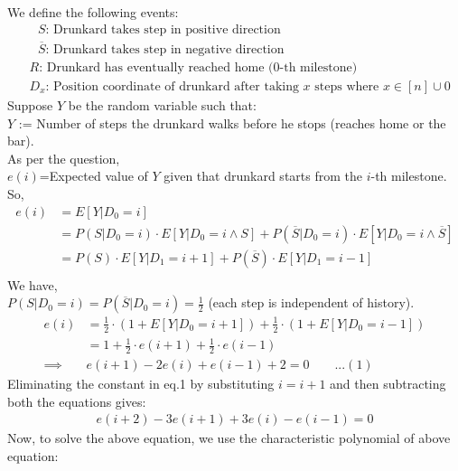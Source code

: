 \documentclass[12pt]{article}
\begin{document}
  \begin{solution}
  We define the following events:
    \begin{align*}
        &\textrm{ $S$: Drunkard takes step in positive direction}\\
        &\textrm{ $\overline{S}$: Drunkard takes step in negative direction}\\
        &\textrm{$R$: Drunkard has eventually reached home (0-th milestone)}\\
        &\textrm{$D_x$: Position coordinate of drunkard after taking $x$ steps where $x \in [n] \cup {0}$}
    \end{align*}
    Suppose $Y$ be the random variable such that:\\
      $Y$ := Number of steps the drunkard walks before he stops (reaches home or the bar).\\
      As per the question,\\
      $e(i)$=Expected value of $Y$ given that drunkard starts from the $i$-th milestone.\\
      So,
      \begin{align*}
        e(i)&=E[Y|D_0 = i]\\
        &=P(S| D_0=i) \cdot E[Y | D_0 = i \wedge S ] + P(\overline{S} | D_0=i) \cdot E[Y | D_0 = i\wedge \overline{S}]\\
        &=P(S) \cdot E[Y|D_1 = i+1] + P(\overline{S}) \cdot E[Y| D_1 = i-1] \\
      \end{align*}
        We have,\\
        $P(S|D_0 = i)= P(\overline{S}|D_0 = i) = \frac{1}{2}$ (each step is independent of history).
      \begin{align*}
        e(i)&=\frac{1}{2}\cdot \left(1 + E[Y|D_0 = i+1]\right) + \frac{1}{2}\cdot \left(1 + E[Y|D_0 = i-1]\right) \\
        &=1 + \frac{1}{2} \cdot e(i+1) + \frac{1}{2} \cdot e(i-1)\\
        \implies& e(i+1) - 2e(i) + e(i-1) + 2 =0 \quad\quad...(1)
      \end{align*}
      Eliminating the constant in eq.1 by substituting $i=i+1$ and then subtracting both the equations gives:\\
      \begin{align*}
        e(i+2) - 3 e(i+1) + 3e(i) - e(i-1) =0 
      \end{align*}
      Now, to solve the above equation, we use the characteristic polynomial of above equation:
      \begin{align*}

\end{align*}
\end{solution}
\end{document}
